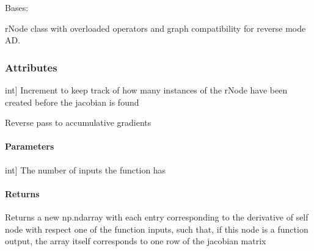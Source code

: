 \documentclass[letterpaper,10pt,english]{sphinxmanual}
\begin{document}
\begin{fulllineitems}
\label{\detokenize{autodiff:autodiff.rNode.rNode}}
\pysigstartsignatures
{}
\pysigstopsignatures
\sphinxAtStartPar
Bases: 

\sphinxAtStartPar
rNode class with overloaded operators and graph compatibility for reverse mode AD.


\subsubsection{Attributes}
\label{\detokenize{autodiff:attributes}}\begin{description}
\sphinxlineitem{increment}{[}int{]}
\sphinxAtStartPar
Increment to keep track of how many instances of the rNode
have been created before the jacobian is found

\end{description}

\begin{fulllineitems}
\label{\detokenize{autodiff:autodiff.rNode.rNode.backward}}
\pysigstartsignatures
{}
\pysigstopsignatures
\sphinxAtStartPar
Reverse pass to accumulative gradients


\paragraph{Parameters}
\label{\detokenize{autodiff:id48}}\begin{description}
\sphinxlineitem{num\_inputs}{[}int{]}
\sphinxAtStartPar
The number of inputs the function has

\end{description}


\paragraph{Returns}
\label{\detokenize{autodiff:id49}}\begin{description}
\sphinxAtStartPar
Returns a new np.ndarray with each entry corresponding to the derivative
of self node with respect one of the function inputs, such that, if this
node is a function output, the array itself corresponds to one row of
the jacobian matrix


\end{description}
\end{fulllineitems}
\end{fulllineitems}
\end{document}
